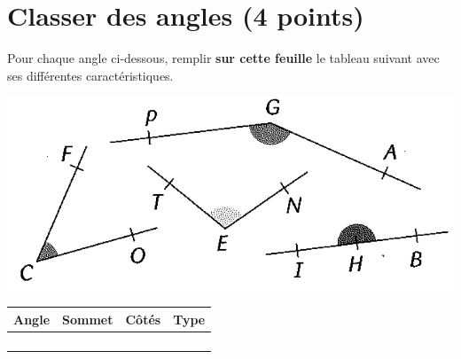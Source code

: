 \section{Classer des angles (4 points)}

\begin{questions}
	\question[4] Pour chaque angle ci-dessous, remplir \textbf{sur cette feuille  }le tableau suivant avec ses différentes caractéristiques.
	
	 \begin{center}
	 	\includegraphics[scale=0.4]{img/angles}
	 \end{center}

\begin{tabular}{|c|c|c|c|}
	\hline
	\textbf{Angle} & \textbf{Sommet} & \textbf{Côtés} & \textbf{Type} \\ \hline
	&                 &                &               \\ \hline
	&                 &                &               \\ \hline
	&                 &                &               \\ \hline
	&                 &                &               \\ \hline
\end{tabular}

\end{questions}